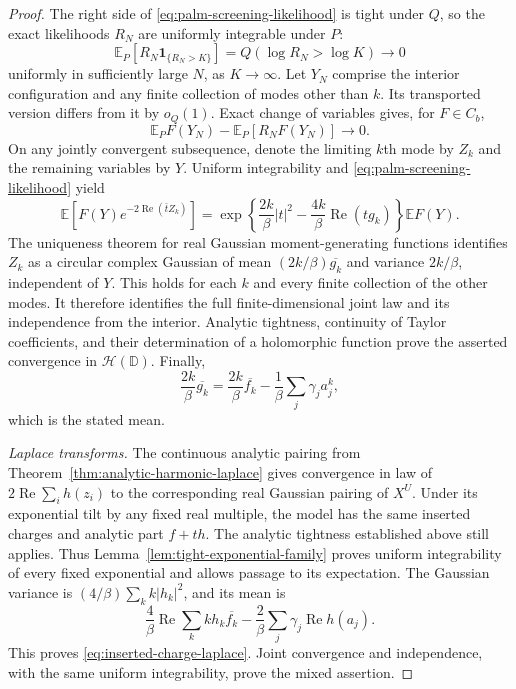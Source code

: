 \documentclass[11pt,a4paper]{article}
\numberwithin{equation}{section}
\theoremstyle{definition}
\theoremstyle{remark}
\newcommand{\D}{\mathbb D}
\begin{document}
\begin{proof}
The right side of \eqref{eq:palm-screening-likelihood} is tight under
$Q$, so the exact likelihoods $R_N$ are uniformly integrable under $P$:
\[
 \mathbb E_P[R_N\mathbf1_{\{R_N>K\}}]
       =Q(\log R_N>\log K)\longrightarrow0
\]
uniformly in sufficiently large $N$, as $K\to\infty$.
Let $Y_N$ comprise the interior configuration and any finite collection
of modes other than $k$. Its transported version differs from it by
$o_Q(1)$. Exact change of variables gives, for $F\in C_b$,
\[
 \mathbb E_PF(Y_N)-\mathbb E_P[R_NF(Y_N)]\longrightarrow0.
\]
On any jointly convergent subsequence, denote the limiting $k$th mode
by $Z_k$ and the remaining variables by $Y$. Uniform integrability and
\eqref{eq:palm-screening-likelihood} yield
\[
 \mathbb E[F(Y)e^{-2\operatorname{Re}(\bar t Z_k)}]
 =\exp\left\{\frac{2k}{\beta}|t|^2
           -\frac{4k}{\beta}\operatorname{Re}(tg_k)\right\}\mathbb EF(Y).
\]
The uniqueness theorem for real Gaussian moment-generating functions
identifies $Z_k$ as a circular complex Gaussian of mean
$(2k/\beta)\overline{g_k}$ and variance $2k/\beta$, independent of $Y$.
This holds for each $k$ and every finite collection of the other modes.
It therefore identifies the full finite-dimensional joint law and its
independence from the interior. Analytic tightness, continuity of Taylor
coefficients, and their determination of a holomorphic function prove
the asserted convergence in $\mathcal H(\D)$. Finally,
\[
 \frac{2k}{\beta}\overline{g_k}
 =\frac{2k}{\beta}\overline{f_k}
             -\frac1\beta\sum_j\gamma_j a_j^k,
\]
which is the stated mean.

\emph{Laplace transforms.}
The continuous analytic pairing from
Theorem~\ref{thm:analytic-harmonic-laplace} gives convergence in law of
$2\operatorname{Re}\sum_i h(z_i)$ to the corresponding real Gaussian
pairing of $X^U$. Under its exponential tilt by any fixed real multiple,
the model has the same inserted charges and analytic part $f+th$.
The analytic tightness established above still applies. Thus
Lemma~\ref{lem:tight-exponential-family} proves uniform integrability
of every fixed exponential and allows passage to its expectation.
The Gaussian variance is $(4/\beta)\sum_k k|h_k|^2$, and its mean is
\[
 \frac4\beta\operatorname{Re}\sum_k kh_k\overline{f_k}
       -\frac2\beta\sum_j\gamma_j\operatorname{Re}h(a_j).
\]
This proves \eqref{eq:inserted-charge-laplace}. Joint convergence and
independence, with the same uniform integrability, prove the mixed
assertion.
\end{proof}
\end{document}
